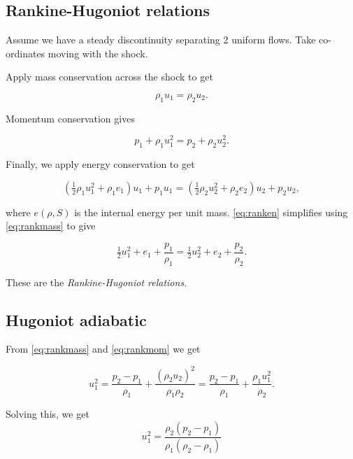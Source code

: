 \documentclass{notes}
\begin{document}
\subsection{Rankine-Hugoniot relations}

Assume we have a steady discontinuity separating 2 uniform flows.
Take co-ordinates moving with the shock.

\vspace{1in}

Apply mass conservation across the shock to get

\begin{equation}\label{eq:rankmass}
\rho_1 u_1 = \rho_2 u_2.
\end{equation}

Momentum conservation gives

\begin{equation}\label{eq:rankmom}
p_1 + \rho_1 u_1^2 = p_2 + \rho_2 u_2^2.
\end{equation}

Finally, we apply energy conservation to get

\begin{equation}\label{eq:ranken}
\left( \tfrac{1}{2} \rho_1 u_1^2 + \rho_1 e_1 \right) u_1 + p_1 u_1 =
\left( \tfrac{1}{2} \rho_2 u_2^2 + \rho_2 e_2 \right) u_2 + p_2 u_2,
\end{equation}

where $e(\rho,S)$ is the internal energy per unit mass.  \eqref{eq:ranken}
simplifies using \eqref{eq:rankmass} to give

\begin{equation}\label{eq:ranken2}
\tfrac{1}{2} u_1^2 + e_1 + \frac{p_1}{\rho_1} =
\tfrac{1}{2} u_2^2 + e_2 + \frac{p_2}{\rho_2}.
\end{equation}

These are the \emph{Rankine-Hugoniot relations}.

\subsection{Hugoniot adiabatic}

From \eqref{eq:rankmass} and \eqref{eq:rankmom} we get

\[
u_1^2 = \frac{p_2 - p_1}{\rho_1} + \frac{\left( \rho_2 u_2 \right)^2}{\rho_1
\rho_2} = \frac{p_2 - p_1}{\rho_1} + \frac{\rho_1 u_1^2}{\rho_2}.
\]

Solving this, we get
\begin{equation}\label{eq:shockU}
u_1^2 = \frac{\rho_2 (p_2 - p_1)}{\rho_1(\rho_2 - \rho_1)}
\end{equation}
\end{document}
